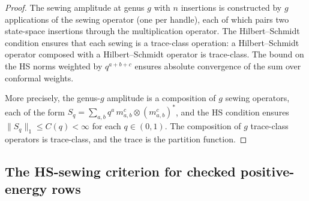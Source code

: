 \begin{proof}
The sewing amplitude at genus $g$ with $n$ insertions is constructed by
$g$ applications of the sewing operator (one per handle), each of which
pairs two state-space insertions through the multiplication operator.
The Hilbert--Schmidt condition ensures that each sewing is a trace-class
operation: a Hilbert--Schmidt operator composed with a Hilbert--Schmidt
operator is trace-class. The bound on the HS norms weighted by $q^{a+b+c}$
ensures absolute convergence of the sum over conformal weights.

More precisely, the genus-$g$ amplitude is a composition of $g$ sewing
operators, each of the form
$S_q = \sum_{a,b} q^a\, m_{a,b}^c \otimes (m^c_{a,b})^*$,
and the HS condition ensures $\|S_q\|_1 \le C(q) < \infty$ for each
$q \in (0,1)$. The composition of $g$ trace-class operators is trace-class,
and the trace is the partition function.
\end{proof}

\subsection{The HS-sewing criterion for checked positive-energy rows}

